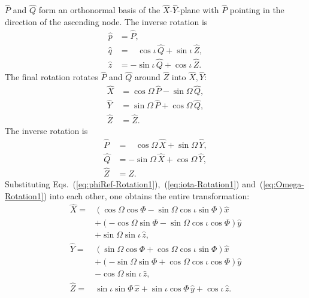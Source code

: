 \documentclass[11pt,tightenlines,article,amssymb,amsmath,amsfonts,superscriptaddress,nofootinbib]{revtex4}
\newcommand{\ExS}{{{\hat x}}}
\newcommand{\EyS}{{{\hat y}}}
\newcommand{\EzS}{{{\hat z}}}
\newcommand{\ExW}{\hat X}
\newcommand{\EyW}{\hat Y}
\newcommand{\EzW}{\hat Z}
\newcommand{\phiRef}{\Phi} %
\begin{document}
 $\hat P$ and $\hat Q$ form an orthonormal basis of the $\ExW$-$\EyW$-plane 
 with $\hat P$ pointing in the direction of the ascending node.
The inverse rotation is
\begin{subequations}
  \label{eq:iota-Rotation2}
\begin{align}
  \hat p&=\hat P,\\
  \hat q&=\;\;\;\cos\iota\,\hat Q + \sin\iota\,\EzW,\\
  \EzS &=-\sin\iota\,\hat Q+\cos\iota\,\EzW.
\end{align}
\end{subequations}
The final rotation rotates $\hat P$ and $\hat Q$
around $\EzW$ into $\ExW,\EyW$:
\begin{subequations}
  \label{eq:Omega-Rotation1}
\begin{align}
  \ExW&=\cos\Omega\,\hat P-\sin\Omega\,\hat Q,\\
  \EyW&=\sin\Omega\,\hat P+\cos\Omega\,\hat Q,\\
  \EzW&=\EzW.
\end{align}
\end{subequations}
The inverse rotation is
\begin{subequations}
  \label{eq:Omega-Rotation2}
\begin{align}
  \hat P&=\;\;\;\cos\Omega\,\ExW+\sin\Omega\,\EyW,\\
  \hat Q&=-\sin\Omega\,\ExW+\cos\Omega\,\EyW,\\
  \EzW&=\EzW.
\end{align}
\end{subequations}
Substituting Eqs.~(\ref{eq:phiRef-Rotation1}),~(\ref{eq:iota-Rotation1}) and~(\ref{eq:Omega-Rotation1}) into each other, one obtains the entire transformation:
\begin{subequations}
  \label{eq:Source-To-Wave}
  \begin{align}
    \ExW=& \left(\cos\Omega\cos\phiRef-\sin\Omega\cos\iota\sin\phiRef\right)\ExS
    \nonumber \\
    & + \left(-\cos\Omega\sin\phiRef-\sin\Omega\cos\iota\cos\phiRef\right)\EyS
    \nonumber\\
    & + \sin\Omega\sin\iota\,\EzS,\\
\EyW=& \left(\sin\Omega\cos\phiRef+\cos\Omega\cos\iota\sin\phiRef\right)\ExS
    \nonumber \\
    & + \left(-\sin\Omega\sin\phiRef+\cos\Omega\cos\iota\cos\phiRef\right)\EyS
    \nonumber\\
    & - \cos\Omega\sin\iota\,\EzS,\\
\label{eq:Z_from_z}
\EzW=&\sin\iota\sin\phiRef\,\ExS+\sin\iota\cos\phiRef\,\EyS + \cos\iota\,\EzS.
  \end{align}
  \end{subequations}
\end{document}
